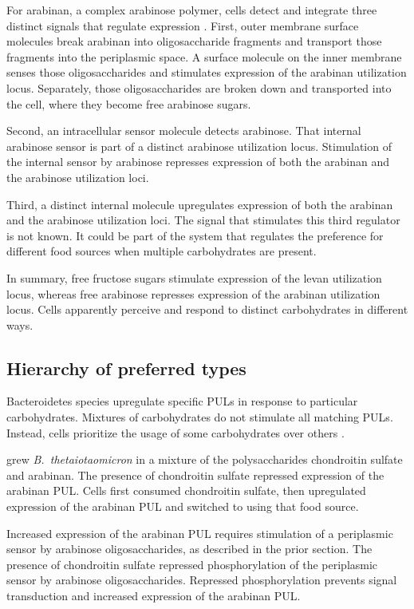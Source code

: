 \documentclass[\mydocfontsize]{article}
\begin{document}
\begin{multicols}{2}
For arabinan, a complex arabinose polymer, cells detect and integrate three distinct signals that regulate expression \autocite{schwalm16multiple}. First, outer membrane surface molecules break arabinan into oligosaccharide fragments and transport those fragments into the periplasmic space. A surface molecule on the inner membrane senses those oligosaccharides and stimulates expression of the arabinan utilization locus. Separately, those oligosaccharides are broken down and transported into the cell, where they become free arabinose sugars. 

Second, an intracellular sensor molecule detects arabinose. That internal arabinose sensor is part of a distinct arabinose utilization locus.  Stimulation of the internal sensor by arabinose represses expression of both the arabinan and the arabinose utilization loci. 

Third, a distinct internal molecule upregulates expression of both the arabinan and the arabinose utilization loci. The signal that stimulates this third regulator is not known. It could be part of the system that regulates the preference for different food sources when multiple carbohydrates are present.

In summary, free fructose sugars stimulate expression of the levan utilization locus, whereas free arabinose represses expression of the arabinan utilization locus. Cells apparently perceive and respond to distinct carbohydrates in different ways.

\subsection{Hierarchy of preferred types}

Bacteroidetes species upregulate specific PULs in response to particular carbohydrates. Mixtures of carbohydrates do not stimulate all matching PULs. Instead, cells prioritize the usage of some carbohydrates over others \autocite{martens11recognition,rogers13dynamic,ravcheev13polysaccharides,pudlo15symbiotic,cao16cis-encoded,comstock16small}. 

\textcite{schwalm17prioritization} grew \textit{B.\ thetaiotaomicron} in a mixture of the polysaccharides chondroitin sulfate and arabinan. The presence of chondroitin sulfate repressed expression of the arabinan PUL. Cells first consumed chondroitin sulfate, then upregulated expression of the arabinan PUL and switched to using that food source. 

Increased expression of the arabinan PUL requires stimulation of a periplasmic sensor by arabinose oligosaccharides, as described in the prior section. The presence of chondroitin sulfate repressed phosphorylation of the periplasmic sensor by arabinose oligosaccharides. Repressed phosphorylation prevents signal transduction and increased expression of the arabinan PUL.


\end{multicols}
\end{document}

